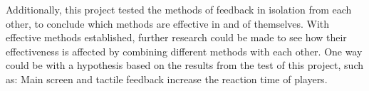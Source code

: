 Additionally, this project tested the methods of feedback in isolation from each other, to conclude which methods are effective in and of themselves. With effective methods established, further research could be made to see how their effectiveness is affected by combining different methods with each other. One way could be with a hypothesis based on the results from the test of this project, such as: Main screen and tactile feedback increase the reaction time of players. 